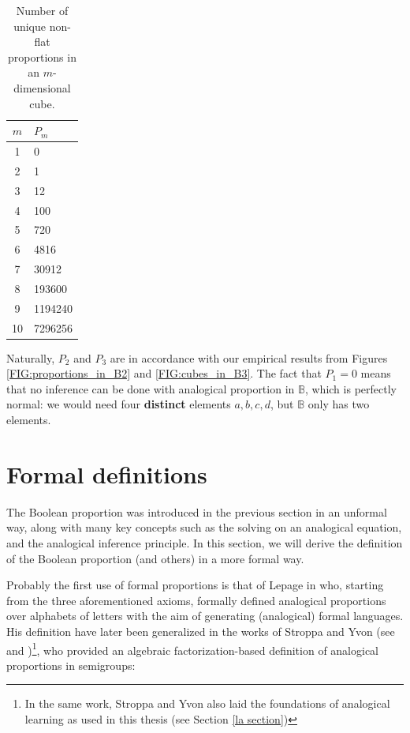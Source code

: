 \begin{table}[h!]
\centering
  \begin{tabular}{| c | l |}
\toprule
 $m$ & $P_m$\\
\midrule
    1	&	0\\
    2 &	1\\
    3	&	12\\
    4	&	100\\
    5 &	720\\
    6 &	4816\\
    7 &	30912\\
    8 &	193600\\
    9 & 1194240\\
    10 & 7296256\\
\bottomrule
\end{tabular}
\caption{Number of unique non-flat proportions in an $m$-dimensional cube.}
\label{TAB:n_params_in_cube}
\end{table}

Naturally, $P_2$ and $P_3$ are in accordance with our empirical  results from
Figures \ref{FIG:proportions_in_B2} and \ref{FIG:cubes_in_B3}. The fact that
$P_1 = 0$ means that no inference can be done with analogical proportion in
$\mathbb{B}$, which is perfectly normal: we would need four \textbf{distinct}
elements $a, b, c ,d$, but $\mathbb{B}$ only has two elements.



\section{Formal definitions}
\label{SEC:formal_definitions_proportions}

The Boolean proportion was introduced in the previous section in an unformal
way, along with many key concepts such as the solving on an analogical
equation, and the analogical inference principle. In this section, we will
derive the definition of the Boolean proportion (and others) in a more formal
way.

Probably the first use of formal proportions is that of Lepage in
\cite{Lep04} who, starting from the three aforementioned axioms, formally
defined analogical proportions over alphabets of letters with the aim of
generating (analogical) formal languages. His definition have later been
generalized in the works of Stroppa and Yvon (see \cite{StrYvoCNLL05} and
\cite{StrYvoREPORT05})\footnote{In the same work, Stroppa and Yvon also laid
the foundations of analogical learning as used in this thesis (see Section
\ref{la section})}, who provided an algebraic factorization-based definition of
analogical proportions in semigroups:

